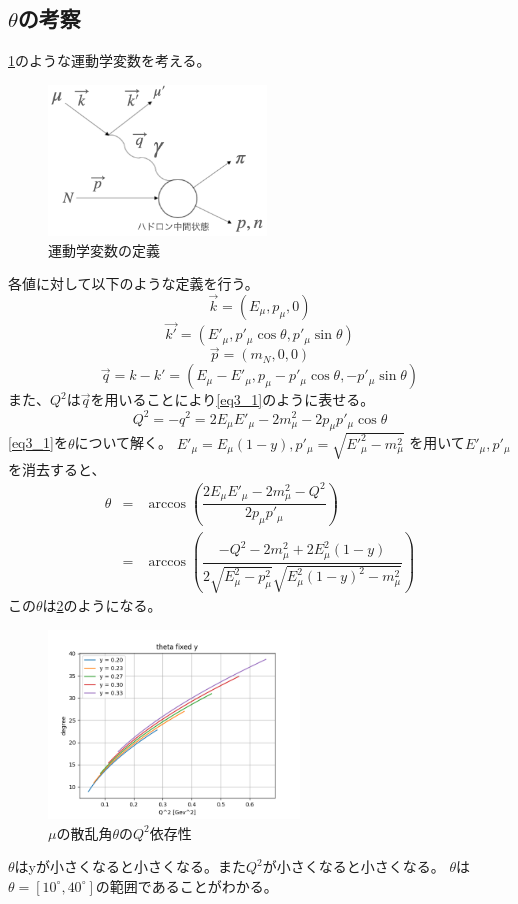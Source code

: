 \subsection{$\theta$の考察}
\ref{fig:angle2}のような運動学変数を考える。
\begin{figure}[H]
    \centering
    \includegraphics[height=4cm]{img/diagram_3momentum.png}
    \caption{運動学変数の定義}
    \label{fig:angle2}
\end{figure}
各値に対して以下のような定義を行う。
\begin{equation}
    \vec{k} = (E_\mu , p_\mu,0)
\end{equation}
\begin{equation}
    \vec{k'} = (E'_\mu, p'_\mu \cos\theta, p'_\mu \sin\theta)
\end{equation}
\begin{equation}
    \vec{p} = (m_N, 0, 0)
\end{equation}
\begin{equation}
    \vec{q} = k-k'=(E_\mu - E'_\mu, p_\mu-p'_\mu \cos\theta, -p'_\mu \sin\theta)
\end{equation}
また、$Q^2$は$\vec{q}$を用いることにより\ref{eq3_1}のように表せる。
\begin{equation}
    \label{eq3_1}
    Q^2 = -q^2 = 2E_\mu E'_\mu -2m^2_\mu-2p_\mu p'_\mu \cos\theta
\end{equation}
\ref{eq3_1}を$\theta$について解く。
$E'_\mu = E_\mu(1-y), p'_\mu = \sqrt{E'^2_\mu - m^2_\mu}$
を用いて$E'_\mu, p'_\mu$を消去すると、
\begin{eqnarray}
    \theta & = &\arccos{(\dfrac {2E_\mu E'_\mu -2m^2_\mu-Q^2}{2p_\mu p'_\mu})} \\
    & = & \arccos{(\dfrac{-Q^2-2m^2_\mu+2E^2_\mu(1-y)}{2\sqrt{E^2_\mu-p^2_\mu}\sqrt{E^2_\mu(1-y)^2-m^2_\mu} } )}
\end{eqnarray}
この$\theta$は\ref{fig:angle3}のようになる。
\begin{figure}[H]
    \centering
    \includegraphics[height=5cm]{img/theta_degree_y_fixed.png}
    \caption{$\mu$の散乱角$\theta$の$Q^2$依存性}
    \label{fig:angle3}
\end{figure}
$\theta$はyが小さくなると小さくなる。また$Q^2$が小さくなると小さくなる。
$\theta$は$\theta=[10^\circ,40^\circ]$の範囲であることがわかる。

